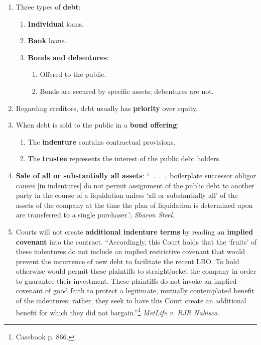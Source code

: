 \begin{enumerate}
    \item Three types of \textbf{debt}:
    \begin{enumerate}
        \item \textbf{Individual} loans.
        \item \textbf{Bank} loans.
        \item \textbf{Bonds and debentures}:
        \begin{enumerate}
            \item Offered to the public.
            \item Bonds are secured by specific assets; debentures are not.
        \end{enumerate}
    \end{enumerate}
    \item Regarding creditors, debt usually has \textbf{priority} over equity.
    \item When debt is sold to the public in a \textbf{bond offering}:
    \begin{enumerate}
        \item The \textbf{indenture} contains contractual provisions.
        \item The \textbf{trustee} represents the interest of the public debt 
        holders.
    \end{enumerate}
    \item \textbf{Sale of all or substantially all assets}: 
    ``~.~.~.~boilerplate successor obligor causes [in indentures] do not 
    permit assignment of the public debt to another party in the course of 
    a liquidation unless `all or substantially all' of the assets of the 
    company at the time the plan of liquidation is determined upon are 
    transferred to a single purchaser.'; \emph{Sharon Steel}.
    \item Courts will not create \textbf{additional indenture terms} by 
    reading an \textbf{implied covenant} into the contract. ``Accordingly, 
    this Court holds that the `fruits' of these indentures do not include an 
    implied restrictive covenant that would prevent the incurrence of new debt 
    to facilitate the recent LBO. To hold otherwise would permit these 
    plaintiffs to straightjacket the company in order to guarantee their 
    investment. These plaintiffs do not invoke an implied covenant of good 
    faith to protect a legitimate, mutually contemplated benefit of the 
    indentures; rather, they seek to have this Court create an additional 
    benefit for which they did not bargain.''\footnote{Casebook p. 866.} 
    \emph{MetLife v. RJR Nabisco}.
\end{enumerate}
